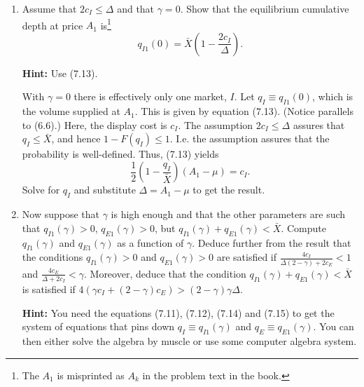 \documentclass[11pt
, answers
]{exam}
\begin{document}
\begin{enumerate}[label=(\alph*). ]
	\item Assume that $2c_{I} \leq \Delta$ and that $\gamma=0$. Show that the equilibrium cumulative depth at price $A_{1}$ is\footnote{The $A_{1}$ is misprinted as $A_{k}$ in the problem text in the book.}  
	\[
	q_{I1}(0)=\bar{X}\left( 1-\frac{2c_{I}}{\Delta}\right).
	\]
	
	\textbf{Hint:} Use (7.13).
	
	\begin{solution}
		With $\gamma=0$ there is effectively only one market, $I$. Let $q_{I} \equiv q_{I1}(0)$, which is the volume supplied at $A_{1}$. This is given by equation (7.13). (Notice parallels to (6.6).) Here, the display cost is $c_{I}$. The assumption $2c_{I} \leq \Delta$ assures that $q_{I} \leq \bar{X}$, and hence $1-F(q_{I}) \leq 1$. I.e. the assumption assures that the probability is well-defined. Thus, (7.13) yields
		\[
		\frac{1}{2}\left(1-\frac{q_{I}}{\bar{X}}\right) (A_{1}-\mu) = c_{I}.
		\]
		Solve for $q_{I}$ and substitute $\Delta=A_1-\mu$ to get the result.
	\end{solution}
	
	
	\item Now suppose that $\gamma$ is high enough and that the other parameters are such that $q_{I1}(\gamma)>0$, $q_{E1}(\gamma)>0$, but $q_{I1}(\gamma)+q_{E1}(\gamma)<\bar{X}$. Compute $q_{I1}(\gamma)$ and $q_{E1}(\gamma)$ as a function of $\gamma$. Deduce further from the result that the conditions  $q_{I1}(\gamma)>0$ and $q_{E1}(\gamma)>0$ are satisfied if $\frac{4c_{I}}{\Delta(2-\gamma)+2c_{E}}<1$ and $\frac{4c_{E}}{\Delta+2c_{I}}<\gamma$. Moreover, deduce that the condition $q_{I1}(\gamma)+q_{E1}(\gamma)<\bar{X}$ is satisfied if $4(\gamma c_{I}+(2-\gamma)c_{E})>(2-\gamma)\gamma \Delta$.
	
	\textbf{Hint:} You need the equations (7.11), (7.12), (7.14) and (7.15) to get the system of equations that pins down $q_I \equiv q_{I1}(\gamma)$ and $q_E \equiv q_{E1}(\gamma)$. You can then either solve the algebra by muscle or use some computer algebra system. 
	

\end{enumerate}
\end{document}
